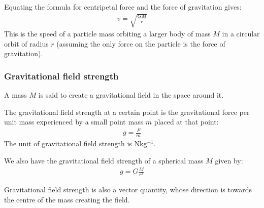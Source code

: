 Equating the formula for centripetal force and the force of gravitation gives:
\begin{align*}
    v = \sqrt{\frac{GM}{r}}
\end{align*}
This is the speed of a particle mass orbiting a larger body of mass $M$ in a
circular orbit of radius $r$ (assuming the only force on the particle is the
force of gravitation).

\subsubsection{Gravitational field strength}
A mass $M$ is said to create a gravitational field in the space around it.
\begin{definition}
    The gravitational field strength at a certain point is the gravitational
    force per unit mass experienced by a small point mass $m$ placed at that
    point:
    \begin{align*}
        g = \frac{F}{m}
    \end{align*}
    The unit of gravitational field strength is Nkg$^{-1}$.
\end{definition}

We also have the gravitational field strength of a spherical mass $M$ given by:
\begin{align*}
    g = G \frac{M}{r^2}
\end{align*}

Gravitational field strength is also a vector quantity, whose direction is
towards the centre of the mass creating the field.

